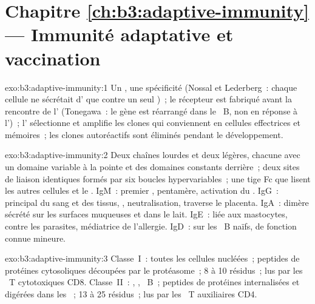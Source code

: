 \section*{Chapitre \ref{ch:b3:adaptive-immunity} --- Immunité adaptative et vaccination}

\begin{solution}{exo:b3:adaptive-immunity:1}
Un , une spécificité (Nossal et Lederberg~: chaque cellule ne
sécrétait d' que contre un seul )~; le récepteur est
fabriqué avant la rencontre de l' (Tonegawa~: le gène est
réarrangé dans le ~B, non en réponse à l')~;
l' sélectionne et amplifie les clones qui conviennent en
cellules effectrices et mémoires~; les clones autoréactifs sont
éliminés pendant le développement.
\end{solution}

\begin{solution}{exo:b3:adaptive-immunity:2}
Deux chaînes lourdes et deux légères, chacune avec un domaine variable
à la pointe et des domaines constants derrière~; deux sites de liaison
identiques formés par six boucles hypervariables~; une tige Fc que
lisent les autres cellules et le . IgM~: premier ,
pentamère, activation du . IgG~: principal  du sang
et des tissus, , neutralisation, traverse le placenta.
IgA~: dimère sécrété sur les surfaces muqueuses et dans le lait. IgE~:
liée aux mastocytes, contre les parasites, médiatrice de l'allergie.
IgD~: sur les ~B naïfs, de fonction connue mineure.
\end{solution}

\begin{solution}{exo:b3:adaptive-immunity:3}
Classe~I~: toutes les cellules nucléées~; peptides de protéines
cytosoliques découpées par le protéasome~; 8 à 10 résidus~; lus par les
~T cytotoxiques CD8. Classe~II~: ,
, ~B~; peptides de protéines internalisées et
digérées dans les ~; 13 à 25 résidus~; lus par les
~T auxiliaires CD4.
\end{solution}

